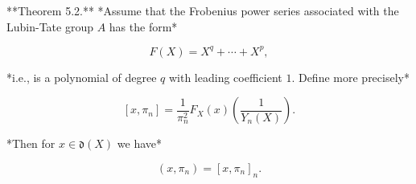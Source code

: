 **Theorem 5.2.** *Assume that the Frobenius power series associated with the Lubin-Tate group $A$ has the form*

$$F(X) = X^q + \cdots + X^{p},$$

*i.e., is a polynomial of degree $q$ with leading coefficient $1$. Define more precisely*

$$[x, \pi_n] = \frac{1}{\pi_n^2} F_X(x) \left( \frac{1}{Y_n(X)} \right).$$

*Then for $x \in \mathfrak{d}(X)$ we have*

$$(x, \pi_n) = [x, \pi_n]_n.$$
